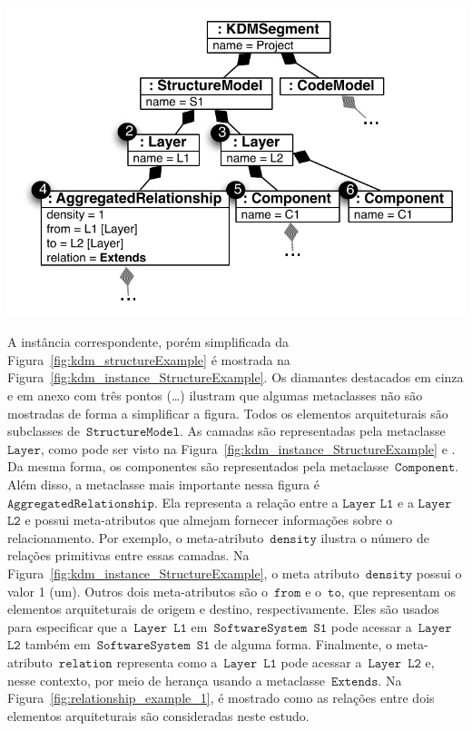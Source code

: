 \begin{minipage}{.55\textwidth}
	\centering
	\includegraphics[scale=0.67]{images/StructureKDMINstance}
	\fautor
	\label{fig:kdm_instance_StructureExample}
\end{minipage}

A instância correspondente, porém simplificada da Figura~\ref{fig:kdm_structureExample} é mostrada na Figura~\ref{fig:kdm_instance_StructureExample}. Os diamantes destacados em cinza e em anexo com três pontos (\ldots) ilustram que algumas metaclasses não são mostradas de forma a simplificar a figura. Todos os elementos arquiteturais são subclasses de~$\mathtt{StructureModel}$. As camadas são representadas pela metaclasse~$\mathtt{Layer}$, como pode ser visto na Figura~\ref{fig:kdm_instance_StructureExample}  e . Da mesma forma, os componentes são representados pela metaclasse~$\mathtt{Component}$. Além disso, a metaclasse mais importante nessa figura é $\mathtt{AggregatedRelationship}$. Ela representa a relação entre a $\mathtt{Layer}$ $\mathtt{L1}$ e a $\mathtt{Layer}$ $\mathtt{L2}$ e possui meta-atributos que almejam fornecer informações sobre o relacionamento. Por exemplo, o meta-atributo~$\mathtt{density}$ ilustra o número de relações primitivas entre essas camadas. Na Figura~\ref{fig:kdm_instance_StructureExample}, o meta atributo~$\mathtt{density}$ possui o valor 1 (um). Outros dois meta-atributos são o~$\mathtt{from}$ e o~$\mathtt{to}$, que representam os elementos arquiteturais de origem e destino, respectivamente. Eles são usados para especificar que a~$\mathtt{Layer}$~$\mathtt{L1}$ em~$\mathtt{SoftwareSystem}$~$\mathtt{S1}$ pode acessar a~$\mathtt{Layer}$~$\mathtt{L2}$ também em~$\mathtt{SoftwareSystem}$~$\mathtt{S1}$ de alguma forma. Finalmente, o meta-atributo~$\mathtt{relation}$ representa como a~$\mathtt{Layer}$~$\mathtt{L1}$ pode acessar a~$\mathtt{Layer}$~$\mathtt{L2}$ e, nesse contexto, por meio de herança usando a metaclasse~$\mathtt{Extends}$. Na Figura~\ref{fig:relationship_example_1}, é mostrado como as relações entre dois elementos arquiteturais são consideradas neste estudo.

